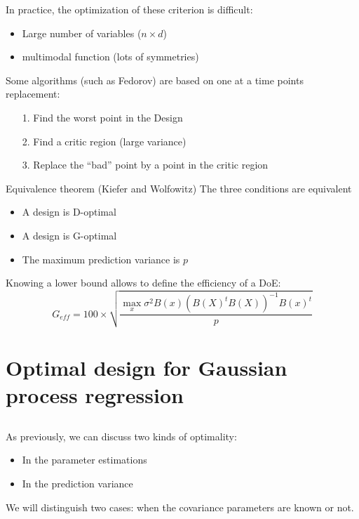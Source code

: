 \documentclass{beamer}
\begin{document}
\begin{frame}{}
In practice, the optimization of these criterion is difficult:
\begin{itemize}
	\item Large number of variables ($n \times d$)
	\item multimodal function (lots of symmetries)
\end{itemize}
\vspace{10mm}
Some algorithms (such as Fedorov) are based on one at a time points replacement:
\begin{itemize}
 	\item[1.] Find the worst point in the Design
 	\item[2.] Find a critic region (large variance)
 	\item[3.] Replace the ``bad'' point by a point in the critic region 
 \end{itemize} 
\end{frame}

\begin{frame}{}
\begin{block}{Equivalence theorem (Kiefer and Wolfowitz)}
The three conditions are equivalent
\begin{itemize}
 	\item A design is D-optimal
 	\item A design is G-optimal
 	\item The maximum prediction variance is $p$ 
 \end{itemize} 
\end{block}
\vspace{5mm}
Knowing a lower bound allows to define the efficiency of a DoE:
$$G_{eff} = 100 \times \sqrt{ \frac{\max_x \sigma^2 B(x) (B(X)^t B(X))^{-1} B(x)^t}{p}}$$
\end{frame}

\section[Optimal DoE for GPR]{Optimal design for Gaussian process regression}
\subsection{}

\begin{frame}{}
As previously, we can discuss two kinds of optimality:
\begin{itemize}
	\item In the parameter estimations
	\item In the prediction variance
\end{itemize}
\vspace{5mm}
We will distinguish two cases: when the covariance parameters are known or not.
\end{frame}
\end{document}
